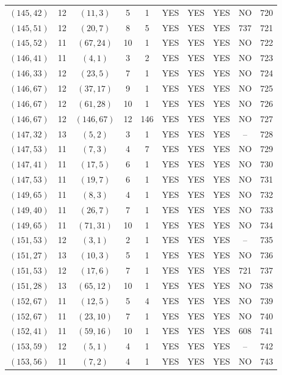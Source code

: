 \begin{longtable}{|c|c|c|c|c|c|c|c|c|c|}
$(145, 42)$ & 12 & $(11, 3)$ & 5 & 1 & YES & YES & YES & NO & 720\\
$(145, 51)$ & 12 & $(20, 7)$ & 8 & 5 & YES & YES & YES & 737 & 721\\
$(145, 52)$ & 11 & $(67, 24)$ & 10 & 1 & YES & YES & YES & NO & 722\\
$(146, 41)$ & 11 & $(4, 1)$ & 3 & 2 & YES & YES & YES & NO & 723\\
$(146, 33)$ & 12 & $(23, 5)$ & 7 & 1 & YES & YES & YES & NO & 724\\
$(146, 67)$ & 12 & $(37, 17)$ & 9 & 1 & YES & YES & YES & NO & 725\\
$(146, 67)$ & 12 & $(61, 28)$ & 10 & 1 & YES & YES & YES & NO & 726\\
$(146, 67)$ & 12 & $(146, 67)$ & 12 & 146 & YES & YES & YES & NO & 727\\
$(147, 32)$ & 13 & $(5, 2)$ & 3 & 1 & YES & YES & YES & -- & 728\\
$(147, 53)$ & 11 & $(7, 3)$ & 4 & 7 & YES & YES & YES & NO & 729\\
$(147, 41)$ & 11 & $(17, 5)$ & 6 & 1 & YES & YES & YES & NO & 730\\
$(147, 53)$ & 11 & $(19, 7)$ & 6 & 1 & YES & YES & YES & NO & 731\\
$(149, 65)$ & 11 & $(8, 3)$ & 4 & 1 & YES & YES & YES & NO & 732\\
$(149, 40)$ & 11 & $(26, 7)$ & 7 & 1 & YES & YES & YES & NO & 733\\
$(149, 65)$ & 11 & $(71, 31)$ & 10 & 1 & YES & YES & YES & NO & 734\\
$(151, 53)$ & 12 & $(3, 1)$ & 2 & 1 & YES & YES & YES & -- & 735\\
$(151, 27)$ & 13 & $(10, 3)$ & 5 & 1 & YES & YES & YES & NO & 736\\
$(151, 53)$ & 12 & $(17, 6)$ & 7 & 1 & YES & YES & YES & 721 & 737\\
$(151, 28)$ & 13 & $(65, 12)$ & 10 & 1 & YES & YES & YES & NO & 738\\
$(152, 67)$ & 11 & $(12, 5)$ & 5 & 4 & YES & YES & YES & NO & 739\\
$(152, 67)$ & 11 & $(23, 10)$ & 7 & 1 & YES & YES & YES & NO & 740\\
$(152, 41)$ & 11 & $(59, 16)$ & 10 & 1 & YES & YES & YES & 608 & 741\\
$(153, 59)$ & 12 & $(5, 1)$ & 4 & 1 & YES & YES & YES & -- & 742\\
$(153, 56)$ & 11 & $(7, 2)$ & 4 & 1 & YES & YES & YES & NO & 743\\

\end{longtable}
